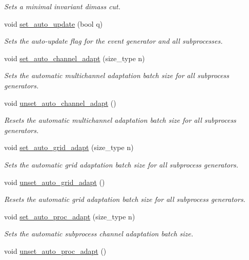 \begin{DoxyCompactItemize}
\begin{DoxyCompactList}\small\item\em Sets a minimal invariant dimass cut. \end{DoxyCompactList}\item 
void \hyperlink{a00210_ad42b308b9ba23af048890ce001c030d2}{set\-\_\-auto\-\_\-update} (bool q)
\begin{DoxyCompactList}\small\item\em Sets the auto-\/update flag for the event generator and all subprocesses. \end{DoxyCompactList}\item 
void \hyperlink{a00210_a282384cafa65698ff2f83c3f44a5062c}{set\-\_\-auto\-\_\-channel\-\_\-adapt} (size\-\_\-type n)
\begin{DoxyCompactList}\small\item\em Sets the automatic multichannel adaptation batch size for all subprocess generators. \end{DoxyCompactList}\item 
void \hyperlink{a00210_aba9c35d889ecf3d604ffaa3351189281}{unset\-\_\-auto\-\_\-channel\-\_\-adapt} ()
\begin{DoxyCompactList}\small\item\em Resets the automatic multichannel adaptation batch size for all subprocess generators. \end{DoxyCompactList}\item 
void \hyperlink{a00210_a53d7227457f76185f7c53ac126fdece6}{set\-\_\-auto\-\_\-grid\-\_\-adapt} (size\-\_\-type n)
\begin{DoxyCompactList}\small\item\em Sets the automatic grid adaptation batch size for all subprocess generators. \end{DoxyCompactList}\item 
void \hyperlink{a00210_a5fe8988e5090b3b70aff590c1b0b2fbb}{unset\-\_\-auto\-\_\-grid\-\_\-adapt} ()
\begin{DoxyCompactList}\small\item\em Resets the automatic grid adaptation batch size for all subprocess generators. \end{DoxyCompactList}\item 
\hypertarget{a00210_aea8c67081c9dc3c8db030451ec44a487}{void \hyperlink{a00210_aea8c67081c9dc3c8db030451ec44a487}{set\-\_\-auto\-\_\-proc\-\_\-adapt} (size\-\_\-type n)}\label{a00210_aea8c67081c9dc3c8db030451ec44a487}

\begin{DoxyCompactList}\small\item\em Sets the automatic subprocess channel adaptation batch size. \end{DoxyCompactList}\item 
\hypertarget{a00210_a753b23a599fe1992ef49fb61c5489293}{void \hyperlink{a00210_a753b23a599fe1992ef49fb61c5489293}{unset\-\_\-auto\-\_\-proc\-\_\-adapt} ()}\label{a00210_a753b23a599fe1992ef49fb61c5489293}


\end{DoxyCompactItemize}
